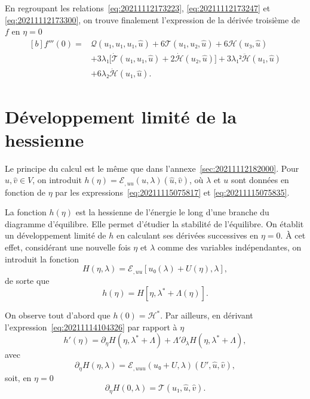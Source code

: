 \documentclass[12pt, final]{amsart}
\begin{document}
En regroupant les relations~\eqref{eq:20211112173223},
\eqref{eq:20211112173247} et \eqref{eq:20211112173300}, on trouve finalement
l'expression de la dérivée troisième de \(f\) en \(η=0\)
\begin{equation}
\label{eq:20211112182402}
  \begin{aligned}[b]
    f'''(0)={}&\mathcal Q(u₁, u₁, u₁, \hat{u})
    +6\mathcal T(u₁, u₂, \hat{u})+6\mathcal H(u₃, \hat{u})\\
    &+3\lambda₁\bigl[\dot{\mathcal T}(u₁, u₁, \hat{u})
    +2\dot{\mathcal H}(u₂, \hat{u})\bigr]
    +3\lambda₁²\ddot{\mathcal H}(u₁, \hat{u})\\
    &+6\lambda₂\dot{\mathcal H}(u₁, \hat{u}).
  \end{aligned}
\end{equation}

\section{Développement limité de la hessienne}
\label{sec:20211115081016}

Le principe du calcul est le même que dans
l'annexe~\ref{sec:20211112182000}. Pour \(\hat{u}, \hat{v}∈ V\), on introduit
\(h(η)=ℰ_{,uu}(u, \lambda)(\hat{u}, \hat{v})\), où \(\lambda\) et
\(u\) sont données en fonction de \(η\) par les
expressions~\eqref{eq:20211115075817} et \eqref{eq:20211115075835}.

La fonction \(h(η)\) est la hessienne de l'énergie le long d'une branche du
diagramme d'équilibre. Elle permet d'étudier la stabilité de l'équilibre. On
établit un développement limité de \(h\) en calculant ses dérivées successives
en \(η=0\). \`A cet effet, considérant une nouvelle fois \(η\) et
\(\lambda\) comme des variables indépendantes, on introduit la fonction
\begin{equation}
  H(η, \lambda)=ℰ_{,uu}[u₀(\lambda)+U(η), \lambda],
\end{equation}
de sorte que
\begin{equation}
  \label{eq:20211114104326}
  h(η)=H[η, \lambda^\ast+\Lambda(η)].
\end{equation}

On observe tout d'abord que \(h(0)=\mathcal H^\ast\). Par ailleurs, en dérivant
l'expression~\eqref{eq:20211114104326} par rapport à \(η\)
\begin{equation}
  \label{eq:20211114110210}
  h'(η)=\partial_η H(η, \lambda^\ast+\Lambda)
  +\Lambda'\partial_\lambda H(η, \lambda^\ast+\Lambda),
\end{equation}
avec
\begin{equation}
  \label{eq:20211114110852}
  \partial_η H(η, \lambda)=ℰ_{,uuu}(u₀+U, \lambda)(U', \hat{u}, \hat{v}),
\end{equation}
soit, en \(η=0\)
\begin{equation}
  \label{eq:20211114110230}
  \partial_η H(0, \lambda)=\mathcal T(u₁, \hat{u}, \hat{v}).
\end{equation}
\end{document}
